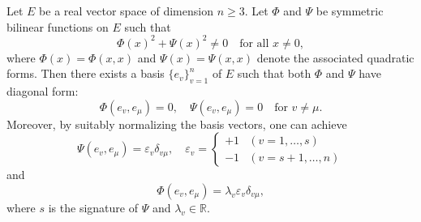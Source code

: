 Let $E$ be a real vector space of dimension $n \geq 3$. Let $\Phi$ and $\Psi$ be symmetric bilinear functions on $E$ such that
$$\Phi(x)^2 + \Psi(x)^2 \neq 0 \quad \text{for all } x \neq 0,$$
where $\Phi(x) = \Phi(x,x)$ and $\Psi(x) = \Psi(x,x)$ denote the associated quadratic forms. Then there exists a basis $\{e_v\}_{v=1}^n$ of $E$ such that both $\Phi$ and $\Psi$ have diagonal form:
$$\Phi(e_v, e_\mu) = 0, \quad \Psi(e_v, e_\mu) = 0 \quad \text{for } v \neq \mu.$$
Moreover, by suitably normalizing the basis vectors, one can achieve
$$\Psi(e_v, e_\mu) = \varepsilon_v \delta_{v\mu}, \quad \varepsilon_v = \begin{cases} +1 & (v = 1, \ldots, s) \\ -1 & (v = s+1, \ldots, n) \end{cases}$$
and
$$\Phi(e_v, e_\mu) = \lambda_v \varepsilon_v \delta_{v\mu},$$
where $s$ is the signature of $\Psi$ and $\lambda_v \in \mathbb{R}$.
